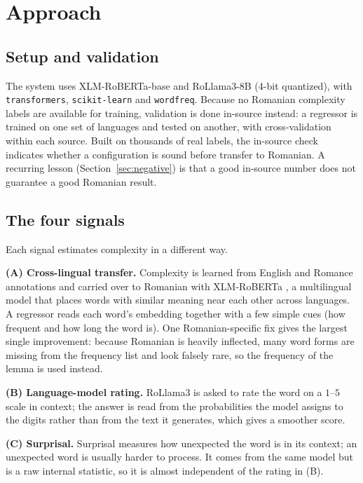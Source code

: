 \documentclass[11pt]{article}
\begin{document}
\section{Approach}
\label{section:approach}

\subsection{Setup and validation}
The system uses XLM-RoBERTa-base and RoLlama3-8B (4-bit quantized), with \texttt{transformers},
\texttt{scikit-learn} and \texttt{wordfreq}.
Because no Romanian complexity labels are available for training, validation is done in-source instead: a regressor
is trained on one set of languages and tested on another, with cross-validation within each source. Built on
thousands of real labels, the in-source check indicates whether a configuration is sound before transfer to
Romanian. A recurring lesson (Section~\ref{sec:negative}) is that a good in-source number does not guarantee a good
Romanian result.

\subsection{The four signals}
Each signal estimates complexity in a different way.

\textbf{(A) Cross-lingual transfer.} Complexity is learned from English and Romance annotations
\citep{shardlow2021complex,shardlow2024mlsp} and carried over to Romanian with XLM-RoBERTa \citep{conneau2020xlmr},
a multilingual model that places words with similar meaning near each other across languages. A regressor reads
each word's embedding together with a few simple cues (how frequent and how long the word is). One
Romanian-specific fix gives the largest single improvement: because Romanian is heavily inflected, many word forms
are missing from the frequency list and look falsely rare, so the frequency of the lemma is used instead.

\textbf{(B) Language-model rating.} RoLlama3 \citep{openllmro2024rollama3} is asked to rate the word on a $1$--$5$
scale in context; the answer is read from the probabilities the model assigns to the digits rather than from the
text it generates, which gives a smoother score.

\textbf{(C) Surprisal.} Surprisal measures how unexpected the word is in its context; an unexpected word is usually
harder to process. It comes from the same model but is a raw internal statistic, so it is almost independent of the
rating in (B).
\end{document}
